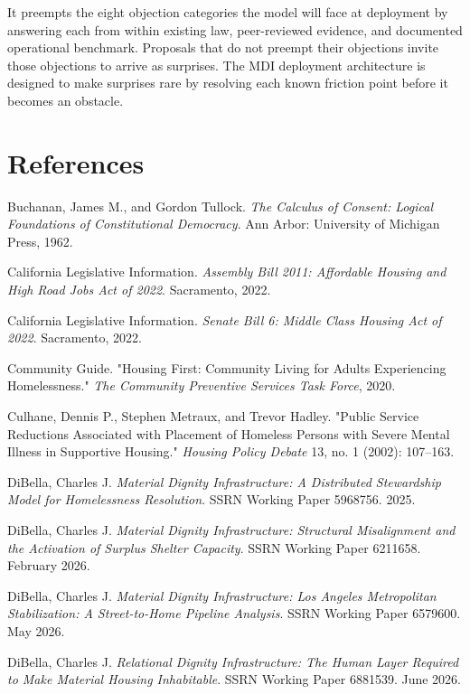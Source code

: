 \documentclass[12pt, letterpaper]{article}
\begin{document}
It preempts the eight objection categories the model will face at deployment by answering each from within existing law, peer-reviewed evidence, and documented operational benchmark. Proposals that do not preempt their objections invite those objections to arrive as surprises. The MDI deployment architecture is designed to make surprises rare by resolving each known friction point before it becomes an obstacle.


\newpage

\section*{References}

Buchanan, James M., and Gordon Tullock. \textit{The Calculus of Consent: Logical Foundations of Constitutional Democracy}. Ann Arbor: University of Michigan Press, 1962.

California Legislative Information. \textit{Assembly Bill 2011: Affordable Housing and High Road Jobs Act of 2022}. Sacramento, 2022.

California Legislative Information. \textit{Senate Bill 6: Middle Class Housing Act of 2022}. Sacramento, 2022.

Community Guide. "Housing First: Community Living for Adults Experiencing Homelessness." \textit{The Community Preventive Services Task Force}, 2020.

Culhane, Dennis P., Stephen Metraux, and Trevor Hadley. "Public Service Reductions Associated with Placement of Homeless Persons with Severe Mental Illness in Supportive Housing." \textit{Housing Policy Debate} 13, no. 1 (2002): 107–163.

DiBella, Charles J. \textit{Material Dignity Infrastructure: A Distributed Stewardship Model for Homelessness Resolution}. SSRN Working Paper 5968756. 2025.

DiBella, Charles J. \textit{Material Dignity Infrastructure: Structural Misalignment and the Activation of Surplus Shelter Capacity}. SSRN Working Paper 6211658. February 2026.

DiBella, Charles J. \textit{Material Dignity Infrastructure: Los Angeles Metropolitan Stabilization: A Street-to-Home Pipeline Analysis}. SSRN Working Paper 6579600. May 2026.

DiBella, Charles J. \textit{Relational Dignity Infrastructure: The Human Layer Required to Make Material Housing Inhabitable}. SSRN Working Paper 6881539. June 2026.
\end{document}
